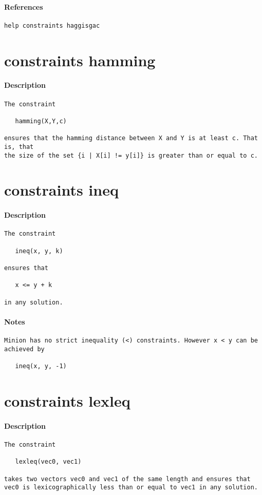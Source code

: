 \paragraph{References}
{\footnotesize
\begin{verbatim}
help constraints haggisgac
\end{verbatim}
}
\section{constraints hamming}
\paragraph{Description}
{\footnotesize
\begin{verbatim}
The constraint

   hamming(X,Y,c)

ensures that the hamming distance between X and Y is at least c. That is, that
the size of the set {i | X[i] != y[i]} is greater than or equal to c.
\end{verbatim}
}
\section{constraints ineq}
\paragraph{Description}
{\footnotesize
\begin{verbatim}
The constraint

   ineq(x, y, k)

ensures that 

   x <= y + k 

in any solution.
\end{verbatim}
}
\paragraph{Notes}
{\footnotesize
\begin{verbatim}
Minion has no strict inequality (<) constraints. However x < y can be
achieved by

   ineq(x, y, -1)
\end{verbatim}
}
\section{constraints lexleq}
\paragraph{Description}
{\footnotesize
\begin{verbatim}
The constraint

   lexleq(vec0, vec1)

takes two vectors vec0 and vec1 of the same length and ensures that
vec0 is lexicographically less than or equal to vec1 in any solution.
\end{verbatim}
}
